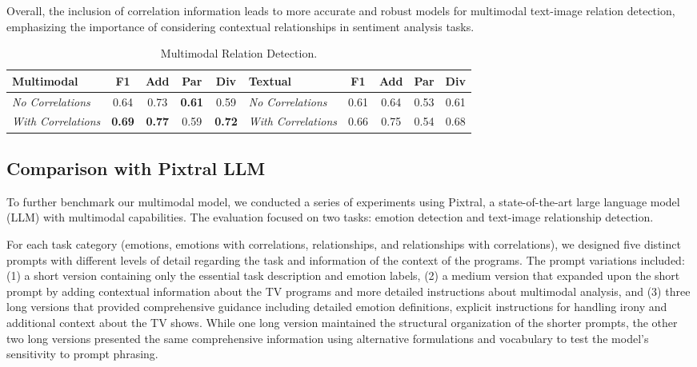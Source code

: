 \documentclass[letterpaper,journal]{IEEEtran}
\begin{document}
Overall, the inclusion of correlation information leads to more accurate and robust models for multimodal text-image relation detection, emphasizing the importance of considering contextual relationships in sentiment analysis tasks.

\begin{table}[htb!]
\begin{center}
{\footnotesize
\begin{tabular}{l|c|c|c|c|l|c|c|c|c}
\hline
\textbf{Multimodal} & \textbf{F1} & \textbf{Add} & \textbf{Par} & \textbf{Div} & \textbf{Textual} & \textbf{F1} & \textbf{Add} & \textbf{Par} & \textbf{Div} \\
\hline
\textit{No Correlations} & 0.64 & 0.73 & \textbf{0.61} & 0.59 & \textit{No Correlations} & 0.61 & 0.64 & 0.53 & 0.61 \\
\textit{With Correlations} & \textbf{0.69} & \textbf{0.77} & 0.59 & \textbf{0.72} & \textit{With Correlations} & 0.66 & 0.75 & 0.54 & 0.68 \\
\hline
\end{tabular}
}
\end{center}
\setlength{\belowcaptionskip}{-0.1cm}
\caption{Multimodal Relation Detection.}
\label{tb:relation_detection}
\end{table}


\subsection{Comparison with Pixtral LLM}

To further benchmark our multimodal model, we conducted a series of experiments using Pixtral, a state-of-the-art large language model (LLM) with multimodal capabilities. The evaluation focused on two tasks: emotion detection and text-image relationship detection.

For each task category (emotions, emotions with correlations, relationships, and relationships with correlations), we designed five distinct prompts with different levels of detail regarding the task and information of the context of the programs. The prompt variations included: (1) a short version containing only the essential task description and emotion labels, (2) a medium version that expanded upon the short prompt by adding contextual information about the TV programs and more detailed instructions about multimodal analysis, and (3) three long versions that provided comprehensive guidance including detailed emotion definitions, explicit instructions for handling irony and additional context about the TV shows. While one long version maintained the structural organization of the shorter prompts, the other two long versions presented the same comprehensive information using alternative formulations and vocabulary to test the model's sensitivity to prompt phrasing.
\end{document}
